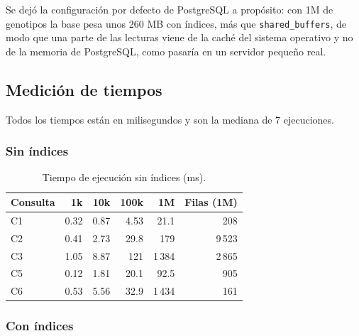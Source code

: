 Se dejó la configuración por defecto de PostgreSQL a propósito: con 1M de genotipos la base pesa unos
260 MB con índices, más que \texttt{shared\_\allowbreak{}buffers}, de modo que una parte de las lecturas
viene de la caché del sistema operativo y no de la memoria de PostgreSQL, como pasaría en un servidor pequeño real.

\subsection{Medición de tiempos}

Todos los tiempos están en milisegundos y son la mediana de 7 ejecuciones.

\subsubsection{Sin índices}

\begin{table}[H]
\centering\small
\begin{tabular}{@{}lrrrrr@{}}
\toprule
Consulta & 1k & 10k & 100k & 1M & Filas (1M) \\
\midrule
C1 & 0.32 & 0.87 & 4.53 & 21.1 & 208 \\
C2 & 0.41 & 2.73 & 29.8 & 179 & 9\,523 \\
C3 & 1.05 & 8.87 & 121 & 1\,384 & 2\,865 \\
C5 & 0.12 & 1.81 & 20.1 & 92.5 & 905 \\
C6 & 0.53 & 5.56 & 32.9 & 1\,434 & 161 \\
\bottomrule
\end{tabular}
\caption{Tiempo de ejecución sin índices (ms).}
\label{tab:sin}
\end{table}

\subsubsection{Con índices}

